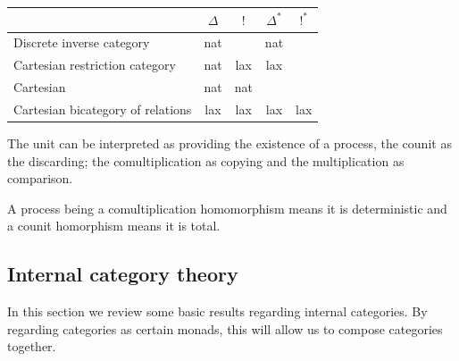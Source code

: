 \hfil
\begin{tabular}{l|cccc}
                                                     & $\Delta$          & $!$             & $\Delta^*$         & $!^*$\\
\hline
Discrete inverse category            & nat &  & nat  & \\
Cartesian restriction category      & nat &  lax  & lax \\
Cartesian                                      & nat & nat &   \\
Cartesian bicategory of relations & lax  & lax & lax & lax \\
\end{tabular}


The unit can be interpreted as providing the existence of a process, the counit as the discarding; the comultiplication as copying and the multiplication as comparison.

A process being a comultiplication homomorphism means it is deterministic and a counit homorphism means it is total.


\subsection{Internal category theory}

%
%
%
%
%
%
%



In this section we review some basic results regarding internal categories.  By regarding categories as certain monads, this will allow us to compose categories together. 


